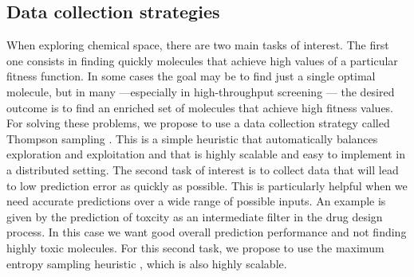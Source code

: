 \subsection{Data collection strategies}

When exploring chemical space, there are two main tasks of interest. The first one consists in finding quickly molecules that achieve high values of a particular fitness function. In some cases the goal may be to find just a single optimal molecule, but in many ---especially in high-throughput screening \cite{Pyzer_Knapp_2015a}--- the desired outcome is to find 
an enriched set of molecules that achieve high fitness values. For solving these problems, we propose to use a data collection strategy called Thompson sampling \cite{Thompson_1933}. This is a simple heuristic that automatically balances exploration and exploitation \cite{Chapelle2011} and that is highly scalable and easy to implement in a distributed setting.
The second task of interest is to collect data that will lead to low prediction error as quickly as possible. This is particularly helpful when we need accurate predictions over a wide range of possible inputs. An example is given by the prediction of toxcity as an intermediate filter in the drug design process. In this case we want good overall prediction performance and not finding highly toxic molecules. For this second task, we propose to use the maximum entropy sampling heuristic \cite{MacKay_1992}, which is also highly scalable.